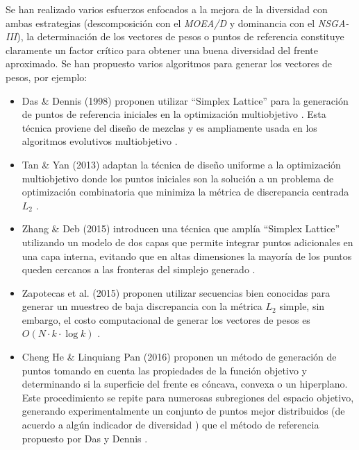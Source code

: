 Se han realizado varios esfuerzos enfocados a la mejora de la diversidad con ambas estrategias (descomposición con el \emph{MOEA/D} y dominancia con el \emph{NSGA-III}), la determinación de los vectores de pesos o puntos de referencia constituye claramente un factor crítico para obtener una buena diversidad del frente aproximado. Se han propuesto varios algoritmos para generar los vectores de pesos, por ejemplo:
\newline

\begin{itemize}
 \item Das \& Dennis (1998) proponen utilizar ``Simplex Lattice'' para la generación de puntos de referencia iniciales en la optimización multiobjetivo \cite{Das:1998:NIN:588907.589322}. Esta técnica proviene del diseño de mezclas y es ampliamente usada en los algoritmos evolutivos multiobjetivo \cite{4358754,6600851}.
 \item Tan \& Yan (2013) adaptan la técnica de diseño uniforme \cite{fang2000uniform} a la optimización multiobjetivo donde los puntos iniciales son la solución a un problema de optimización combinatoria que minimiza la métrica de discrepancia centrada $L_2$ \cite{tan2013moea,fang2002centered}.
 \item Zhang \& Deb (2015) introducen una técnica que amplía ``Simplex Lattice'' utilizando un modelo de dos capas que permite integrar puntos adicionales en una capa interna, evitando que en altas dimensiones la mayoría de los puntos queden cercanos a las fronteras del simplejo generado \cite{li2015evolutionary}.
 \item Zapotecas et al. (2015) proponen utilizar secuencias bien conocidas para generar un muestreo de baja discrepancia con la métrica $L_2$ simple, sin embargo, el costo computacional de generar los vectores de pesos es $O(N \cdot k \cdot \log k)$ \cite{zapotecas2015low}.
 \item Cheng He \& Linquiang Pan (2016) proponen un método de generación de puntos tomando en cuenta las propiedades de la función objetivo y determinando si la superficie del frente es cóncava, convexa o un hiperplano. Este procedimiento se repite para numerosas subregiones del espacio objetivo, generando experimentalmente un conjunto de puntos mejor distribuidos (de acuerdo a algún indicador de diversidad ) que el método de referencia propuesto por Das y Dennis \cite{7748353}.
\end{itemize}

